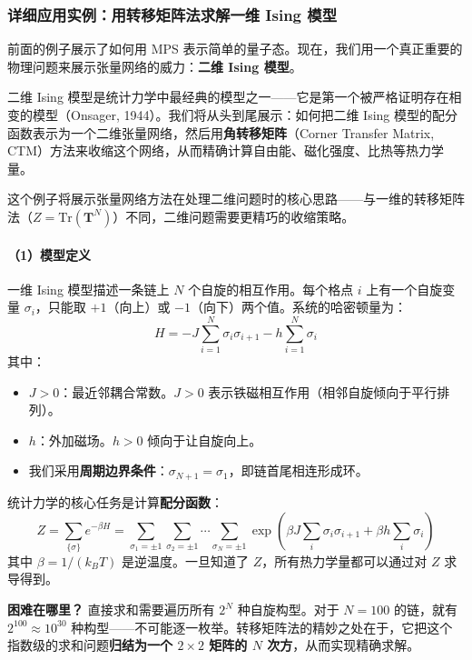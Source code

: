 \documentclass[12pt,a4paper]{ctexart}
\begin{document}
\subsubsection*{详细应用实例：用转移矩阵法求解一维 Ising 模型}

前面的例子展示了如何用 MPS 表示简单的量子态。现在，我们用一个真正重要的物理问题来展示张量网络的威力：\textbf{二维 Ising 模型}。

二维 Ising 模型是统计力学中最经典的模型之一——它是第一个被严格证明存在相变的模型（Onsager, 1944）。我们将从头到尾展示：如何把二维 Ising 模型的配分函数表示为一个二维张量网络，然后用\textbf{角转移矩阵}（Corner Transfer Matrix, CTM）方法来收缩这个网络，从而精确计算自由能、磁化强度、比热等热力学量。

这个例子将展示张量网络方法在处理二维问题时的核心思路——与一维的转移矩阵法（$Z = \mathrm{Tr}(\mathbf{T}^N)$）不同，二维问题需要更精巧的收缩策略。

\paragraph{（1）模型定义}

一维 Ising 模型描述一条链上 $N$ 个自旋的相互作用。每个格点 $i$ 上有一个自旋变量 $\sigma_i$，只能取 $+1$（向上）或 $-1$（向下）两个值。系统的哈密顿量为：
\begin{equation}
    H = -J \sum_{i=1}^{N} \sigma_i \sigma_{i+1} - h \sum_{i=1}^{N} \sigma_i
\end{equation}
其中：
\begin{itemize}
    \item $J > 0$：最近邻耦合常数。$J>0$ 表示铁磁相互作用（相邻自旋倾向于平行排列）。
    \item $h$：外加磁场。$h>0$ 倾向于让自旋向上。
    \item 我们采用\textbf{周期边界条件}：$\sigma_{N+1} = \sigma_1$，即链首尾相连形成环。
\end{itemize}

统计力学的核心任务是计算\textbf{配分函数}：
\begin{equation}
    Z = \sum_{\{\sigma\}} e^{-\beta H} = \sum_{\sigma_1 = \pm 1} \sum_{\sigma_2 = \pm 1} \cdots \sum_{\sigma_N = \pm 1} \exp\!\left(\beta J \sum_{i} \sigma_i \sigma_{i+1} + \beta h \sum_{i} \sigma_i\right)
\end{equation}
其中 $\beta = 1/(k_B T)$ 是逆温度。一旦知道了 $Z$，所有热力学量都可以通过对 $Z$ 求导得到。

\textbf{困难在哪里？} 直接求和需要遍历所有 $2^N$ 种自旋构型。对于 $N = 100$ 的链，就有 $2^{100} \approx 10^{30}$ 种构型——不可能逐一枚举。转移矩阵法的精妙之处在于，它把这个指数级的求和问题\textbf{归结为一个 $2 \times 2$ 矩阵的 $N$ 次方}，从而实现精确求解。
\end{document}
